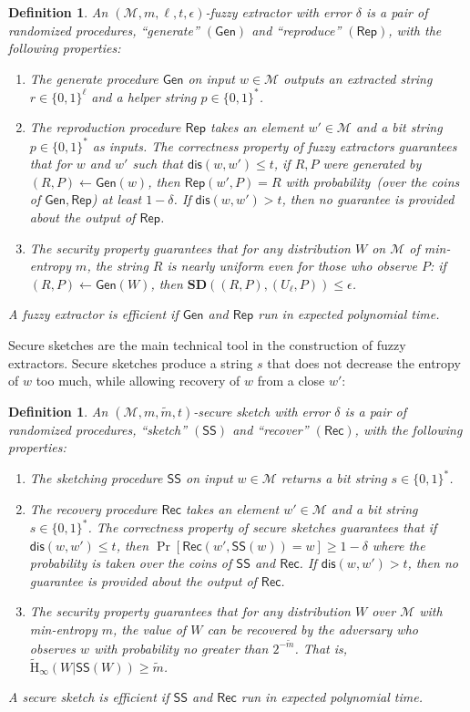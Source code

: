 \documentclass[11pt]{article}
\newcommand{\class}[1]{{\ensuremath{\mathsf{#1}}}}
\newcommand{\gen}{\ensuremath{\class{Gen}}\xspace}
\newcommand{\rep}{\ensuremath{\class{Rep}}\xspace}
\newcommand{\sketch}{\ensuremath{\class{SS}}\xspace}
\newcommand{\rec}{\ensuremath{\class{Rec}}\xspace}
\newcommand{\dis}{\ensuremath{\mathsf{dis}}}
\newcommand{\Hav}{\tilde{\mathrm{H}}_\infty}
\newtheorem{definition}[theorem]{Definition}
\begin{document}
\begin{definition}%
\label{def:fuzzy extractor}
An $(\mathcal{M}, m, \ell, t, \epsilon)$-\emph{fuzzy extractor} with error $\delta$ is a pair of randomized procedures, ``generate'' $(\gen)$ and ``reproduce'' $(\rep)$, with the following properties:
\begin{enumerate}
\item The generate procedure \gen on input $w\in \mathcal{M}$ outputs an extracted string $r\in\{0,1\}^\ell$ and a helper string $p\in\{0,1\}^*$.
\item The reproduction procedure \rep takes an element $w'\in \mathcal{M}$ and a bit string $p\in\{0,1\}^*$ as inputs.  The \emph{correctness} property of fuzzy extractors guarantees that for $w$ and $w'$ such that $\dis(w,w')\leq t$, if $R,P$ were generated by $(R,P)\leftarrow\gen(w)$, then $\rep(w',P)=R$ with probability~(over the coins of $\gen, \rep$) at least $1-\delta$.  If $\dis(w,w')>t$, then no guarantee is provided about the output of \rep.
\item The \emph{security} property guarantees that for any distribution $W$ on $\mathcal{M}$ of min-entropy $m$, the string $R$ is nearly uniform even for those who observe $P$:  if $(R,P)\leftarrow\gen (W)$, then $\mathbf{SD}((R,P),(U_\ell,P))\leq \epsilon$.
\end{enumerate}
A fuzzy extractor is efficient if $\gen$ and $\rep$ run in expected polynomial time.
\end{definition}

Secure sketches are the main technical tool in the construction of fuzzy extractors.  Secure sketches produce a string $s$ that does not decrease the entropy of $w$ too much, while allowing recovery of $w$ from a  close $w'$:
\begin{definition}%
\label{def:secure sketch}
An $(\mathcal{M},m, \tilde{m}, t)$-\emph{secure sketch} with error $\delta$ is a pair of randomized procedures, ``sketch'' $(\sketch)$ and ``recover'' $(\rec)$, with the following properties:
\begin{enumerate}
\item The sketching procedure \sketch on input $w\in\mathcal{M}$ returns a bit string $s\in\{0,1\}^*$.
\item The recovery procedure \rec takes an element $w'\in\mathcal{M}$ and a bit string $s\in\{0,1\}^*$.  The \emph{correctness} property of secure sketches guarantees that if $\dis(w,w')\leq t$, then $\Pr[\rec(w',\sketch(w))=w]\geq 1-\delta$ where the probability is taken over the coins of $\sketch$ and $\rec$.  If $\dis(w,w')>t$, then no guarantee is provided about the output of \rec.
\item The \emph{security} property guarantees that for any distribution $W$ over $\mathcal{M}$ with min-entropy $m$, the value of $W$ can be recovered by the adversary who observes $w$ with probability no greater than $2^{-\tilde{m}}$.  That is, $\Hav(W|\sketch(W))\geq \tilde{m}$.
\end{enumerate}
A secure sketch is \emph{efficient} if \sketch and \rec run in expected polynomial time. 
\end{definition}
\end{document}

